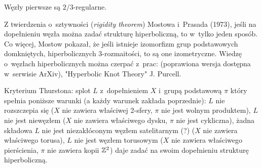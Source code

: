 \begin{conjecture}
    Węzły pierwsze są $2/3$-regularne.
\end{conjecture}


Z twierdzenia o~sztywności (\emph{rigidity theorem}) Mostowa i~Prasada (1973), jeśli na dopełnieniu węzła można zadać strukturę hiperboliczną, to w~tylko jeden sposób.
Co więcej, Mostow pokazał, że jeśli istnieje izomorfizm grup podstawowych domkniętych, hiperbolicznych 3-rozmaitości, to są one izometryczne.
Wiedzę o~węzłach hiperbolicznych można czerpać z~prac: \cite{weeks05} (poprawiona wersja dostępna w~serwisie ArXiv), "Hyperbolic Knot Theory" J. Purcell.

Kryterium Thurstona: splot $L$ z~dopełnieniem $X$ i~grupą podstawową $\pi$ który spełnia poniższe warunki (a każdy warunek zakłada poprzednie): $L$ nie rozszczepia się ($X$ nie zawiera właściwej 2-sfery, $\pi$ nie jest wolnym produktem), $L$ nie jest niewęzłem ($X$ nie zawiera właściwego dysku, $\pi$ nie jest cykliczna), żadna składowa $L$ nie jest niezakłóconym węzłem satelitarnym (?) ($X$ nie zawiera właściwego torusa), $L$ nie jest węzłem torusowym ($X$ nie zawiera właściwego pierścienia, $\pi$ nie zawiera kopii $\mathbb Z^2$) daje zadać na swoim dopełnieniu strukturę hiperboliczną.
